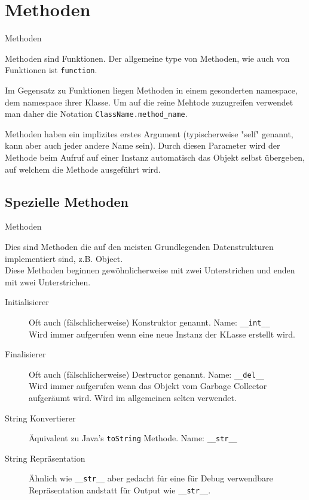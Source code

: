 \section{Methoden}
\begin{frame}[fragile]{Methoden}

Methoden sind Funktionen. Der allgemeine type von Methoden, wie auch von Funktionen ist \texttt{function}. 

Im Gegensatz zu Funktionen liegen Methoden in einem gesonderten namespace, dem namespace ihrer Klasse. Um auf die reine Mehtode zuzugreifen verwendet man daher die Notation \texttt{ClassName.method\_name}.

Methoden haben ein implizites erstes Argument (typischerweise "self" genannt, kann aber auch jeder andere Name sein). Durch diesen Parameter wird der Methode beim Aufruf auf einer Instanz automatisch das Objekt selbst übergeben, auf welchem die Methode ausgeführt wird.

\end{frame}
\subsection{Spezielle Methoden}
\begin{frame}[fragile]{Methoden}

Dies sind Methoden die auf den meisten Grundlegenden Datenstrukturen implementiert sind, z.B. Object.\\
Diese Methoden beginnen gewöhnlicherweise mit zwei Unterstrichen und enden mit zwei Unterstrichen.

\begin{description}
	\item[Initialisierer] Oft auch (fälschlicherweise) Konstruktor genannt. Name: \texttt{\_\_int\_\_}\\
		Wird immer aufgerufen wenn eine neue Instanz der KLasse erstellt wird.
	\item[Finalisierer] Oft auch (fälschlicherweise) Destructor genannt. Name: \texttt{\_\_del\_\_}\\
		Wird immer aufgerufen wenn das Objekt vom Garbage Collector aufgeräumt wird. Wird im allgemeinen selten verwendet.
	\item[String Konvertierer] Äquivalent zu Java's \texttt{toString} Methode. Name: \texttt{\_\_str\_\_}
	\item[String Repräsentation] Ähnlich wie \texttt{\_\_str\_\_} aber gedacht für eine für Debug verwendbare Repräsentation andstatt für Output wie \texttt{\_\_str\_\_}.
\end{description}

\end{frame}



